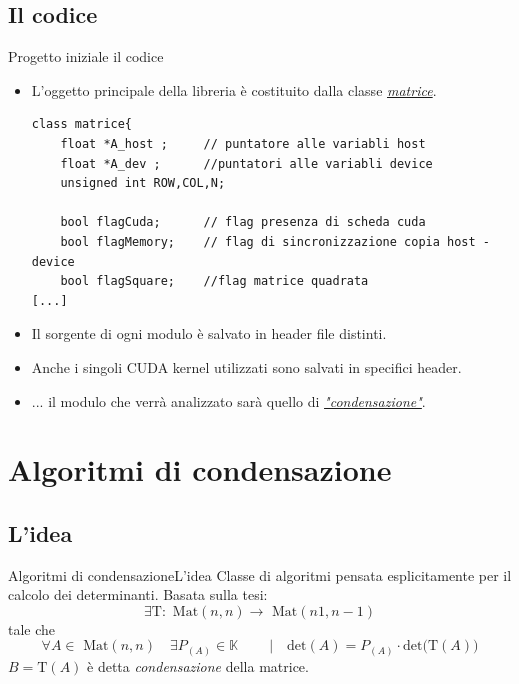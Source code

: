 \documentclass{beamer} %
\begin{document}
\subsection{Il codice}
\begin{frame}[fragile] {Progetto iniziale} {il codice}
\begin{itemize}


\item L'oggetto principale della libreria è costituito dalla classe \href{run:/home/tony/CudaCorso/ProgettoFinale/CudaMatrixClass/Src/Cuda_FloatMatrixClass.cuh}{\color{red}  \emph{matrice}}.
\begin{lstlisting}
class matrice{
	float *A_host ;		// puntatore alle variabli host
	float *A_dev ; 		//puntatori alle variabli device
	unsigned int ROW,COL,N;

	bool flagCuda;		// flag presenza di scheda cuda
	bool flagMemory;	// flag di sincronizzazione copia host -device
	bool flagSquare; 	//flag matrice quadrata
[...]
\end{lstlisting}\pause 

\item  Il sorgente di ogni modulo è salvato in header file distinti.\pause 

\item Anche i singoli CUDA kernel utilizzati sono salvati in specifici header.\pause 

\item ... il modulo che verrà analizzato sarà quello di \href{run:/home/tony/CudaCorso/ProgettoFinale/CudaMatrixClass/Src/Condensation.cuh}{\color{red}  \emph{"condensazione"}}.

\end{itemize}
\end{frame}


\section{Algoritmi di condensazione}
\subsection{L'idea}
\begin{frame}{Algoritmi di condensazione}{L'idea}
Classe di algoritmi pensata esplicitamente per il calcolo dei determinanti.
Basata sulla tesi:
\begin{displaymath}
\exists \mbox{T}: \mbox{ Mat}(n,n) \rightarrow \mbox{ Mat}(n 1,n-1)
\end{displaymath}
tale che
\begin{displaymath}
 \forall A \in \mbox{ Mat}(n,n)\quad \exists P_{(A)} \in \mathbb{K}\: \qquad |\quad  \mbox{det}(A) =  P_{(A)} \cdot \mbox{det}\big( \mbox{T}(A) \big)
\end{displaymath}\pause
\vspace{1cm}
$B= \mbox{T}(A)$ è detta \emph{condensazione} della matrice.

\end{frame}
\end{document}
